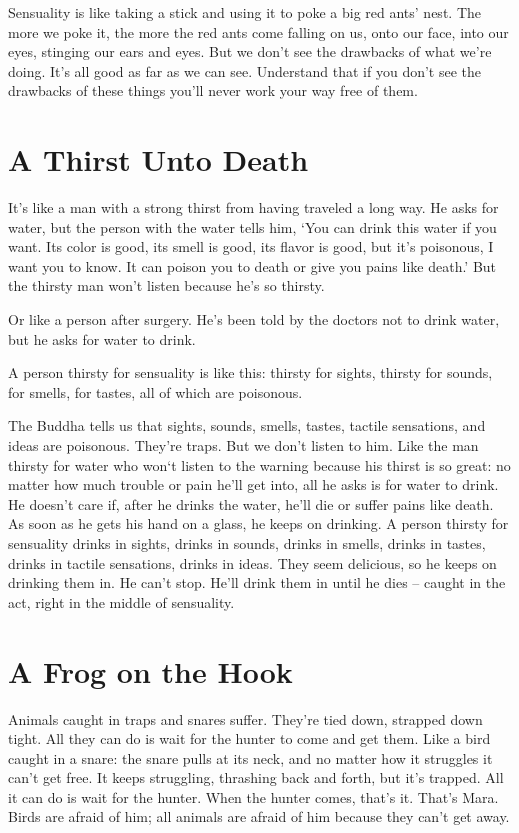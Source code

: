 Sensuality is like taking a stick and using it to poke a big red ants' nest. The more we poke it, the more the red ants come falling on us, onto our face, into our eyes, stinging our ears and eyes. But we don't see the drawbacks of what we're doing. It's all good as far as we can see. Understand that if you don't see the drawbacks of these things you'll never work your way free of them.

\clearpage

\section{A Thirst Unto Death}

It's like a man with a strong thirst from having traveled a long way. He asks for water, but the person with the water tells him, `You can drink this water if you want. Its color is good, its smell is good, its flavor is good, but it's poisonous, I want you to know. It can poison you to death or give you pains like death.' But the thirsty man won't listen because he's so thirsty.

Or like a person after surgery. He's been told by the doctors not to drink water, but he asks for water to drink.

A person thirsty for sensuality is like this: thirsty for sights, thirsty for sounds, for smells, for tastes, all of which are poisonous.

The Buddha tells us that sights, sounds, smells, tastes, tactile sensations, and ideas are poisonous. They're traps. But we don't listen to him. Like the man thirsty for water who won`t listen to the warning because his thirst is so great: no matter how much trouble or pain he'll get into, all he asks is for water to drink. He doesn't care if, after he drinks the water, he'll die or suffer pains like death. As soon as he gets his hand on a glass, he keeps on drinking. A person thirsty for sensuality drinks in sights, drinks in sounds, drinks in smells, drinks in tastes, drinks in tactile sensations, drinks in ideas. They seem delicious, so he keeps on drinking them in. He can't stop. He'll drink them in until he dies -- caught in the act, right in the middle of sensuality.

\clearpage

\section{A Frog on the Hook}

Animals caught in traps and snares suffer. They're tied down, strapped down tight. All they can do is wait for the hunter to come and get them. Like a bird caught in a snare: the snare pulls at its neck, and no matter how it struggles it can't get free. It keeps struggling, thrashing back and forth, but it's trapped. All it can do is wait for the hunter. When the hunter comes, that's it. That's Mara. Birds are afraid of him; all animals are afraid of him because they can't get away.

